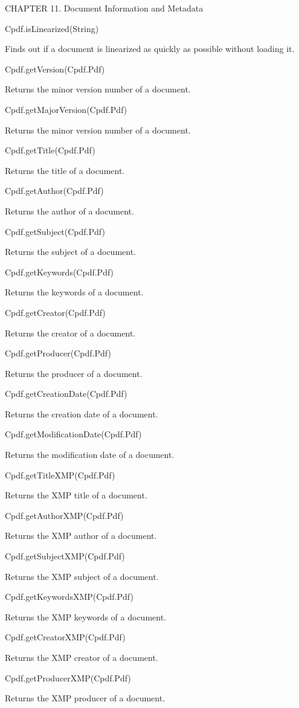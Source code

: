 CHAPTER 11. Document Information and Metadata

Cpdf.isLinearized(String)

Finds out if a document is linearized as quickly as possible without loading
it.

Cpdf.getVersion(Cpdf.Pdf)

Returns the minor version number of a document.

Cpdf.getMajorVersion(Cpdf.Pdf)

Returns the minor version number of a document.

Cpdf.getTitle(Cpdf.Pdf)

Returns the title of a document.

Cpdf.getAuthor(Cpdf.Pdf)

Returns the author of a document.

Cpdf.getSubject(Cpdf.Pdf)

Returns the subject of a document.

Cpdf.getKeywords(Cpdf.Pdf)

Returns the keywords of a document.

Cpdf.getCreator(Cpdf.Pdf)

Returns the creator of a document.

Cpdf.getProducer(Cpdf.Pdf)

Returns the producer of a document.

Cpdf.getCreationDate(Cpdf.Pdf)

Returns the creation date of a document.

Cpdf.getModificationDate(Cpdf.Pdf)

Returns the modification date of a document.

Cpdf.getTitleXMP(Cpdf.Pdf)

Returns the XMP title of a document.

Cpdf.getAuthorXMP(Cpdf.Pdf)

Returns the XMP author of a document.

Cpdf.getSubjectXMP(Cpdf.Pdf)

Returns the XMP subject of a document.

Cpdf.getKeywordsXMP(Cpdf.Pdf)

Returns the XMP keywords of a document.

Cpdf.getCreatorXMP(Cpdf.Pdf)

Returns the XMP creator of a document.

Cpdf.getProducerXMP(Cpdf.Pdf)

Returns the XMP producer of a document.


